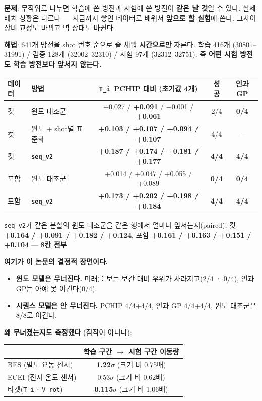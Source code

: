 \documentclass[10pt]{article}
\newcommand{\Ti}{\texttt{T\_i}}
\newcommand{\Vrot}{\texttt{V\_rot}}
\newcommand{\seqv}{\texttt{seq\_v2}}
\begin{document}
\textbf{문제}: 무작위로 나누면 학습에 쓴 방전과 시험에 쓴 방전이 \textbf{같은 날 것}일 수
있다. 실제 배치 상황은 다르다 --- 지금까지 쌓인 데이터로 배워서 \textbf{앞으로 할 실험}에
쓴다. 그사이 장비 교정도 바뀌고 벽 상태도 바뀐다.

\textbf{해법}: 641개 방전을 shot 번호 순으로 줄 세워 \textbf{시간으로만} 자른다.
학습 416개 (30801--31991) / 검증 128개 (32002--32310) / 시험 97개 (32312--32751).
즉 \textbf{어떤 시험 방전도 학습 방전보다 앞서지 않는다.}

\begin{center}
\footnotesize
\setlength{\tabcolsep}{4.5pt}
\begin{tabular}{@{}llccc@{}}
\toprule
\textbf{데이터} & \textbf{방법} & \textbf{\Ti\ PCHIP 대비 (초기값 4개)} & \textbf{성공} &
  \textbf{인과 GP} \\
\midrule
컷 & 윈도 대조군 & +0.027 / \textbf{+0.091} / $-$0.001 / \textbf{+0.061} & 2/4 & \textbf{0/4} \\
컷 & 윈도 + shot별 표준화 & \textbf{+0.103 / +0.107 / +0.094 / +0.107} & 4/4 & --- \\
컷 & \textbf{\seqv} & \textbf{+0.187 / +0.174 / +0.181 / +0.177} & \textbf{4/4} & \textbf{4/4} \\
\midrule
포함 & 윈도 대조군 & +0.014 / +0.047 / +0.055 / +0.089 & \textbf{0/4} & \textbf{0/4} \\
포함 & \textbf{\seqv} & \textbf{+0.173 / +0.202 / +0.198 / +0.184} & \textbf{4/4} & \textbf{4/4} \\
\bottomrule
\end{tabular}
\end{center}

\seqv 가 같은 분할의 윈도 대조군을 같은 행에서 얼마나 앞서는지(paired):
컷 \textbf{+0.164 / +0.091 / +0.182 / +0.124}, 포함
\textbf{+0.161 / +0.163 / +0.151 / +0.104} --- \textbf{8칸 전부}.

\textbf{여기가 이 논문의 결정적 장면이다.}

\begin{itemize}
\item \textbf{윈도 모델은 무너진다.} 미래를 보는 보간 대비 우위가 사라지고(2/4 · 0/4),
  인과 GP는 아예 못 이긴다(0/4).
\item \textbf{시퀀스 모델은 안 무너진다.} PCHIP 4/4+4/4, 인과 GP 4/4+4/4, 윈도 대조군은
  8/8로 이긴다.
\end{itemize}

\textbf{왜 무너졌는지도 측정했다} (짐작이 아니다):

\begin{center}
\begin{tabular}{@{}lc@{}}
\toprule
 & \textbf{학습 구간 $\rightarrow$ 시험 구간 이동량} \\
\midrule
BES (밀도 요동 센서) & \textbf{1.22$\sigma$} (크기 비 0.75배) \\
ECEI (전자 온도 센서) & 0.53$\sigma$ (크기 비 0.62배) \\
타겟(\Ti\,·\,\Vrot) & \textbf{0.115$\sigma$} (크기 비 1.06배) \\
\bottomrule
\end{tabular}
\end{center}
\end{document}
